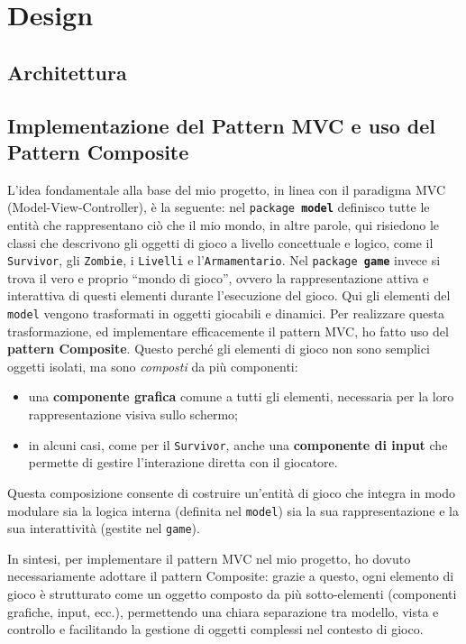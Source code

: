 \documentclass[a4paper,12pt]{report}
\begin{document}
\chapter{Design}

\section{Architettura}
\section{Implementazione del Pattern MVC e uso del Pattern Composite}
%
L'idea fondamentale alla base del mio progetto, in linea con il paradigma MVC (Model-View-Controller), è la seguente: nel \texttt{package \textbf{model}} definisco tutte le entità che rappresentano ciò che il mio mondo, in altre parole, qui risiedono le classi che descrivono gli oggetti di gioco a livello concettuale e logico, come il \texttt{Survivor}, gli \texttt{Zombie}, i \texttt{Livelli} e l'\texttt{Armamentario}.
%
Nel \texttt{package \textbf{game}} invece si trova il vero e proprio “mondo di gioco”, ovvero la rappresentazione attiva e interattiva di questi elementi durante l'esecuzione del gioco. Qui gli elementi del \texttt{model} vengono trasformati in oggetti giocabili e dinamici.
%
Per realizzare questa trasformazione, ed implementare efficacemente il pattern MVC, ho fatto uso del \textbf{pattern Composite}. Questo perché gli elementi di gioco non sono semplici oggetti isolati, ma sono \textit{composti} da più componenti:
%
\begin{itemize}
    \item una \textbf{componente grafica} comune a tutti gli elementi, necessaria per la loro rappresentazione visiva sullo schermo;
    \item in alcuni casi, come per il \texttt{Survivor}, anche una \textbf{componente di input} che permette di gestire l'interazione diretta con il giocatore.
\end{itemize}

Questa composizione consente di costruire un’entità di gioco che integra in modo modulare sia la logica interna (definita nel \texttt{model}) sia la sua rappresentazione e la sua interattività (gestite nel \texttt{game}).

In sintesi, per implementare il pattern MVC nel mio progetto, ho dovuto necessariamente adottare il pattern Composite: grazie a questo, ogni elemento di gioco è strutturato come un oggetto composto da più sotto-elementi (componenti grafiche, input, ecc.), permettendo una chiara separazione tra modello, vista e controllo e facilitando la gestione di oggetti complessi nel contesto di gioco.
\end{document}
